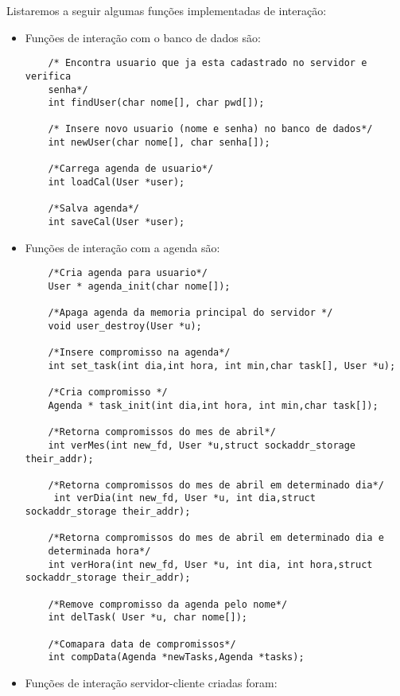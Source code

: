 \documentclass[10pt,a4paper]{article}
\begin{document}
Listaremos a seguir algumas funções implementadas de interação:
\begin{itemize}
\item  Funções de interação com o banco de dados são:
  \begin{lstlisting}
    /* Encontra usuario que ja esta cadastrado no servidor e verifica
    senha*/
    int findUser(char nome[], char pwd[]);
    
    /* Insere novo usuario (nome e senha) no banco de dados*/
    int newUser(char nome[], char senha[]);
    
    /*Carrega agenda de usuario*/
    int loadCal(User *user);
    
    /*Salva agenda*/
    int saveCal(User *user);
  \end{lstlisting}

\item Funções de interação com a agenda  são:

  \begin{lstlisting}
    /*Cria agenda para usuario*/
    User * agenda_init(char nome[]);

    /*Apaga agenda da memoria principal do servidor */
    void user_destroy(User *u);

    /*Insere compromisso na agenda*/
    int set_task(int dia,int hora, int min,char task[], User *u);

    /*Cria compromisso */
    Agenda * task_init(int dia,int hora, int min,char task[]);

    /*Retorna compromissos do mes de abril*/
    int verMes(int new_fd, User *u,struct sockaddr_storage their_addr);

    /*Retorna compromissos do mes de abril em determinado dia*/
     int verDia(int new_fd, User *u, int dia,struct sockaddr_storage their_addr);
    
    /*Retorna compromissos do mes de abril em determinado dia e
    determinada hora*/
    int verHora(int new_fd, User *u, int dia, int hora,struct sockaddr_storage their_addr);

    /*Remove compromisso da agenda pelo nome*/
    int delTask( User *u, char nome[]);

    /*Comapara data de compromissos*/
    int compData(Agenda *newTasks,Agenda *tasks);

  \end{lstlisting}

\item Funções de interação servidor-cliente criadas foram:
  \begin{lstlisting}


\end{lstlisting}
\end{itemize}
\end{document}
